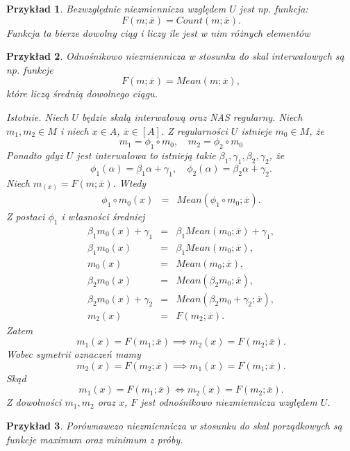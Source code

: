 \documentclass[12pt,a4paper]{report}
\newtheorem{przyklad}{Przykład}
\newcommand{\domkniecie}[1]{\left[ {#1} \right] }
\begin{document}
\begin{przyklad}
Bezwzględnie niezmiennicza względem $U$ jest np. funkcja:
$$
F(m;\overline{x})=Count(m;\overline{x}).
$$
Funkcja ta bierze dowolny ciąg i liczy ile jest w nim różnych elementów
\end{przyklad}
\begin{przyklad}
Odnośnikowo niezmiennicza w stosunku do skal interwałowych są np. funkcje
$$
F(m;\overline{x})=Mean(m;\overline{x}),
$$ 
które liczą średnią dowolnego ciągu.

Istotnie. Niech $U$ będzie skalą interwałową oraz NAS regularny.
Niech $m_1,m_2\in M$ i niech $x \in A $, $\overline{x}\in \domkniecie{A}$. Z regularności $U$ istnieje $m_0 \in M$, że
$$
m_1 = \phi_1 \circ m_0, \quad m_2=\phi_2\circ m_0
$$
Ponadto gdyż $U$ jest interwałowa to istnieją takie $\beta_{1}, \gamma_{1}, \beta_{2}, \gamma_{2}$, że
$$
\phi_1(\alpha)=\beta_1 \alpha + \gamma_1, \quad \phi_2(\alpha)=\beta_2 \alpha + \gamma_2.
$$
Niech $m_(x)=F(m;\overline{x})$. Wtedy
\begin{eqnarray*}
\phi_1\circ m_0(x) & = & Mean(\phi_1\circ m_0;\overline{x}). 
\end{eqnarray*}
Z postaci $\phi_{1}$ i własności średniej
\begin{eqnarray*}
\beta_1m_0(x)+ \gamma_1 & = & \beta_1 Mean(m_0;\overline{x}) + \gamma_1, \\
\beta_1m_0(x) & = & \beta_1 Mean(m_0;\overline{x}), \\
m_0(x) & = & Mean(m_0;\overline{x}), \\
\beta_2m_0(x) & = & Mean(\beta_2 m_0;\overline{x}), \\
\beta_2m_0(x) + \gamma_2 & = & Mean(\beta_2 m_0 + \gamma_2;\overline{x}),  \\
m_2(x) & = & F(m_2;\overline{x}) .
\end{eqnarray*}
Zatem
$$
m_1(x)=F(m_1;\overline{x}) \implies m_2(x)=F(m_2;\overline{x}).
$$
Wobec symetrii oznaczeń mamy
$$
m_2(x)=F(m_2;\overline{x}) \implies m_1(x)=F(m_1;\overline{x}).
$$
Skąd
$$
m_1(x)=F(m_1;\overline{x}) \iff m_2(x)=F(m_2;\overline{x}).
$$
Z dowolności $m_1,m_2$ oraz $x$, $F$ jest odnośnikowo niezmiennicza względem $U$.
\end{przyklad}
\begin{przyklad}
Porównawczo niezmiennicza w stosunku do skal porządkowych są funkcje maximum oraz minimum z próby.
\end{przyklad}
\end{document}

